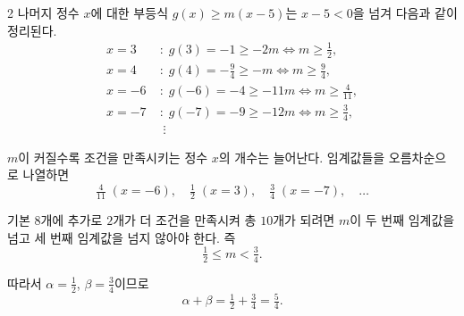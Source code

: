 \documentclass[10pt]{article}
\begin{document}
\begin{multicols}{2}
나머지 정수 $x$에 대한 부등식 $g(x) \ge m(x - 5)$는 $x - 5 < 0$을 넘겨 다음과 같이 정리된다.
\begin{align*}
x = 3\;&:\; g(3) = -1 \ge -2m \iff m \ge \tfrac{1}{2}, \\
x = 4\;&:\; g(4) = -\tfrac{9}{4} \ge -m \iff m \ge \tfrac{9}{4}, \\
x = -6\;&:\; g(-6) = -4 \ge -11m \iff m \ge \tfrac{4}{11}, \\
x = -7\;&:\; g(-7) = -9 \ge -12m \iff m \ge \tfrac{3}{4}, \\
&\;\vdots
\end{align*}

$m$이 커질수록 조건을 만족시키는 정수 $x$의 개수는 늘어난다. 임계값들을 오름차순으로 나열하면
\[ \tfrac{4}{11}\; (x=-6),\quad \tfrac{1}{2}\; (x=3),\quad \tfrac{3}{4}\; (x=-7),\quad \ldots \]

기본 $8$개에 추가로 $2$개가 더 조건을 만족시켜 총 $10$개가 되려면 $m$이 두 번째 임계값을 넘고 세 번째 임계값을 넘지 않아야 한다. 즉
\[ \tfrac{1}{2} \le m < \tfrac{3}{4}. \]

따라서 $\alpha = \tfrac{1}{2}$, $\beta = \tfrac{3}{4}$이므로
\[ \alpha + \beta = \tfrac{1}{2} + \tfrac{3}{4} = \tfrac{5}{4}. \]

\end{multicols}
\end{document}
